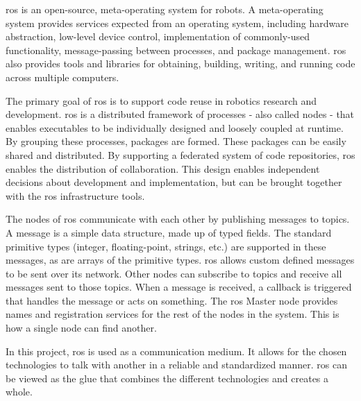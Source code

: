 \ac{ros} is an open\hyp{}source, meta\hyp{}operating system for robots. A meta\hyp{}operating system provides services expected from an operating system, including hardware abstraction, low\hyp{}level device control, implementation of commonly\hyp{}used functionality, message\hyp{}passing between processes, and package management. \acs{ros} also provides tools and libraries for obtaining, building, writing, and running code across multiple computers. \cite{ros_introduction}

The primary goal of \acs{ros} is to support code reuse in robotics research and development. \acs{ros} is a distributed framework of processes - also called nodes - that enables executables to be individually designed and loosely coupled at runtime. By grouping these processes, packages are formed. These packages can be easily shared and distributed. By supporting a federated system of code repositories, \acs{ros} enables the distribution of collaboration. This design enables independent decisions about development and implementation, but can be brought together with the \acs{ros} infrastructure tools. \cite{newman2017systematic}

The nodes of \acs{ros} communicate with each other by publishing messages to topics. A message is a simple data structure, made up of typed fields. The standard primitive types (integer, floating\hyp{}point, strings, etc.) are supported in these messages, as are arrays of the primitive types. \acs{ros} allows custom defined messages to be sent over its network. Other nodes can subscribe to topics and receive all messages sent to those topics. When a message is received, a callback is triggered that handles the message or acts on something. The \acs{ros} Master node provides names and registration services for the rest of the nodes in the system. This is how a single node can find another. \cite{ros_messages}

In this project, \acs{ros} is used as a communication medium. It allows for the chosen technologies to talk with another in a reliable and standardized manner. \acs{ros} can be viewed as the glue that combines the different technologies and creates a whole.